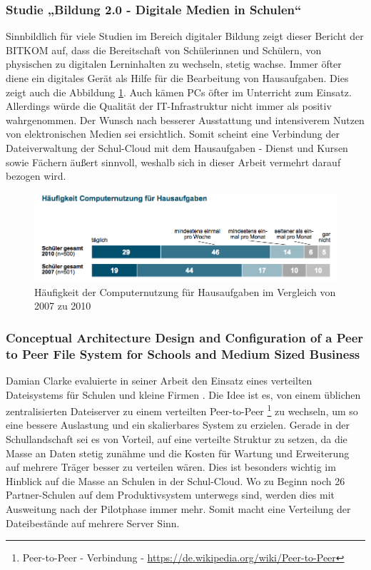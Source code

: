 \subsubsection{Studie „Bildung 2.0 - Digitale Medien in Schulen“}

Sinnbildlich für viele Studien im Bereich digitaler Bildung zeigt dieser Bericht der BITKOM \cite{paper:studiebildung20} auf, dass die Bereitschaft von Schülerinnen und Schülern, von physischen zu digitalen Lerninhalten zu wechseln, stetig wachse. Immer öfter diene ein digitales Gerät als Hilfe für die Bearbeitung von Hausaufgaben. Dies zeigt auch die Abbildung \ref{fig:BitkomNutzungComputerStudie}. Auch kämen PCs öfter im Unterricht zum Einsatz. Allerdings würde die Qualität der IT-Infrastruktur nicht immer als positiv wahrgenommen. Der Wunsch nach besserer Ausstattung und intensiverem Nutzen von elektronischen Medien sei ersichtlich. Somit scheint eine Verbindung der Dateiverwaltung der Schul-Cloud mit dem Hausaufgaben - Dienst und Kursen sowie Fächern äußert sinnvoll, weshalb sich in dieser Arbeit vermehrt darauf bezogen wird.

\begin{figure}[H]
	\centering
	\includegraphics[width=0.8\linewidth]{images/BitkomNutzungComputerStudie}
	\caption[Caption for relatedWork]{Häufigkeit der Computernutzung für Hausaufgaben im Vergleich von 2007 zu 2010\footnotemark}
	\label{fig:BitkomNutzungComputerStudie}
\end{figure}

\subsubsection{Conceptual Architecture Design and Configuration of a Peer to Peer File System for Schools and Medium Sized Business}

Damian Clarke evaluierte in seiner Arbeit den Einsatz eines verteilten Dateisystems für Schulen und kleine Firmen \cite{paper:p2pfilesystemclarke}. Die Idee ist es, von einem üblichen zentralisierten Dateiserver zu einem verteilten Peer-to-Peer \footnote{Peer-to-Peer - Verbindung - \url{https://de.wikipedia.org/wiki/Peer-to-Peer}} zu wechseln, um so eine bessere Auslastung und ein skalierbares System zu erzielen. Gerade in der Schullandschaft sei es von Vorteil, auf eine verteilte Struktur zu setzen, da die Masse an Daten stetig  zunähme und die Kosten für Wartung und Erweiterung auf mehrere Träger besser zu verteilen wären. Dies ist besonders wichtig im Hinblick auf die Masse an Schulen in der Schul-Cloud. Wo zu Beginn noch 26 Partner-Schulen auf dem Produktivsystem unterwegs sind, werden dies mit Ausweitung nach der Pilotphase immer mehr. Somit macht eine Verteilung der Dateibestände auf mehrere Server Sinn.

